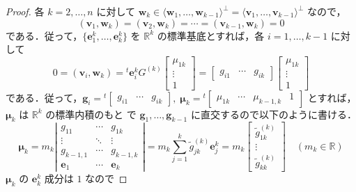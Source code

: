 \documentclass[11pt, uplatex, dvipdfmx]{jsarticle}
\theoremstyle{definition}
\begin{document}
\begin{proof}
  各 $k=2,\ldots, n$ に対して
  $\bm{w}_k \in \langle \bm{w}_1, \ldots, \bm{w}_{k-1}\rangle^{\perp} =
  \langle\bm{v}_1, \ldots, \bm{v}_{k-1}\rangle^{\perp} $ なので，
  \[
    (\bm{v}_1, \bm{w}_k) = (\bm{v}_2, \bm{w}_k) = \cdots = (\bm{v}_{k-1}, \bm{w}_k) = 0
  \]
  である．従って，$\{\bm{e}^k_{1}, \ldots,
  \bm{e}^k_k\}$ を $\mathbb{R}^k$ の標準基底とすれば，各 $i=1,
  \ldots, k-1$ に対して
  \[
    0  =(\bm{v}_i, \bm{w}_k) = {}^{t}\bm{e}^k_{i}
    G^{(k)} \left[
      \begin{array}{c}
        \mu_{1k}\\
        \vdots\\
            1
      \end{array}
    \right]
    = \left[
      \begin{array}{ccc}
        g_{i1} & \cdots & g_{ik}
      \end{array}
    \right] \left[
      \begin{array}{c}
        \mu_{1k}\\
        \vdots \\
        1
      \end{array}
    \right] 
  \]
  である．従って，$\bm{g}_i = {}^{t}\left[
    \begin{array}{ccc}
      g_{i1} & \cdots & g_{ik}
    \end{array}
  \right], \; \bm{\mu}_k = {}^{t}\left[
    \begin{array}{cccc}
      \mu_{1k} & \cdots & \mu_{k-1,k} & 1
    \end{array}
  \right]$ とすれば，$\bm{\mu}_k$ は $\mathbb{R}^k$ の標準内積のもと
  で $\bm{g}_1, \ldots, \bm{g}_{k-1}$ に直交するので以下のように書ける．
  \[
    \bm{\mu}_k = m_k \left|
      \begin{array}{ccc}
        g_{11} & \cdots & g_{1k}\\
        \vdots & \ddots & \vdots\\
        g_{k-1,1} & \cdots & g_{k-1,k}\\
        \bm{e}_1 & \cdots & \bm{e}_k
      \end{array}
    \right| = m_k \sum_{j=1}^{k} \tilde{g}^{(k)}_{jk} \bm{e}^k_j
    = m_k \left[
      \begin{array}{c}
        \tilde{g}^{(k)}_{1k}\\
        \vdots\\
        \tilde{g}^{(k)}_{kk}
      \end{array}
    \right]\quad ( m_k \in \mathbb{R})
  \]
  $\bm{\mu}_k$ の $\bm{e}^k_k$ 成分は $1$ なので

\end{proof}
\end{document}
